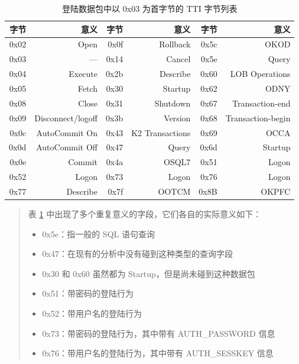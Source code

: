 \begin{table}[!h]
    \centering
    \caption{登陆数据包中以 {\cf 0x03} 为首字节的 TTI 字节列表}
    \begin{tabular}{|>{\cf}r|>{\scriptsize}r|>{\cf}r|>{\scriptsize}r|>{\cf}r|>{\scriptsize}r|} \hline
        字节  & 意义              & 字节 & 意义           & 字节 & 意义             \\ \hline\hline
         0x02 & Open              & 0x0f & Rollback       & 0x5c & OKOD             \\ \hline
         0x03 & ---               & 0x14 & Cancel         & 0x5e & Query            \\ \hline 
         0x04 & Execute           & 0x2b & Describe       & 0x60 & LOB Operations   \\ \hline
         0x05 & Fetch             & 0x30 & Startup        & 0x62 & ODNY             \\ \hline
         0x08 & Close             & 0x31 & Shutdown       & 0x67 & Transaction-end  \\ \hline
         0x09 & Disconnect/logoff & 0x3b & Version        & 0x68 & Transaction-begin\\ \hline
         0x0c & AutoCommit On     & 0x43 & K2 Transactions& 0x69 & OCCA             \\ \hline
         0x0d & AutoCommit Off    & 0x47 & Query          & 0x6d & Startup          \\ \hline
         0x0e & Commit            & 0x4a & OSQL7          & 0x51 & Logon            \\ \hline
         0x52 & Logon             & 0x73 & Logon          & 0x76 & Logon            \\ \hline
         0x77 & Describe          & 0x7f & OOTCM          & 0x8B & OKPFC            \\ \hline
    \end{tabular}
    \label{tab:oracle-tns-tti}
\end{table}

\begin{quote}
    表 \ref{tab:oracle-tns-tti} 中出现了多个重复意义的字段，它们各自的实际意义如下：

    \begin{itemize}
        \item {\cf 0x5e}：指一般的 SQL 语句查询
        \item {\cf 0x47}：在现有的分析中没有碰到这种类型的查询字段
        \item {\cf 0x30} 和 {\cf 0x60} 虽然都为 Startup，但是尚未碰到这种数据包
        \item {\cf 0x51}：带密码的登陆行为
        \item {\cf 0x52}：带用户名的登陆行为
        \item {\cf 0x73}：带密码的登陆行为，其中带有 {\cf AUTH\_PASSWORD} 信息
        \item {\cf 0x76}：带用户名的登陆行为，其中带有 {\cf AUTH\_SESSKEY} 信息
    \end{itemize}
\end{quote}

